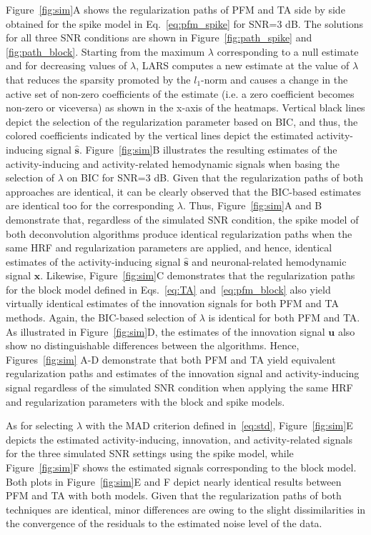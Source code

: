 Figure~\ref{fig:sim}A shows the regularization paths of PFM and TA side by side obtained for the spike model in Eq.~\eqref{eq:pfm_spike} for SNR=3 dB. The solutions for all three SNR conditions are shown in Figure~\ref{fig:path_spike} and \ref{fig:path_block}. Starting from the maximum $\lambda$ corresponding to a null estimate and for decreasing values of $\lambda$, LARS computes a new estimate at the value of $\lambda$ that reduces the sparsity promoted by the \(l_1\)-norm and causes a change in the active set of non-zero coefficients of the estimate (i.e. a zero coefficient becomes non-zero or viceversa) as shown in the x-axis of the heatmaps. Vertical black lines depict the selection of the regularization parameter based on BIC, and thus, the colored coefficients indicated by the vertical lines depict the estimated activity-inducing signal $\mathbf{\hat{{s}}}$. Figure~\ref{fig:sim}B illustrates the resulting estimates of the activity-inducing and activity-related hemodynamic signals when basing the selection of $\lambda$ on BIC for SNR=3 dB. Given that the regularization paths of both approaches are identical, it can be clearly observed that the BIC-based estimates are identical too for the corresponding $\lambda$. Thus, Figure~\ref{fig:sim}A and B demonstrate that, regardless of the simulated SNR condition, the spike model of both deconvolution algorithms produce identical regularization paths when the same HRF and regularization parameters are applied, and hence, identical estimates of the activity-inducing signal $\mathbf{\hat{{s}}}$ and neuronal-related hemodynamic signal $\mathbf{\hat{{x}}}$. Likewise, Figure~\ref{fig:sim}C demonstrates that the regularization paths for the block model defined in Eqs.~\eqref{eq:TA} and~\eqref{eq:pfm_block} also yield virtually identical estimates of the innovation signals for both PFM and TA methods. Again, the BIC-based selection of $\lambda$ is identical for both PFM and TA. As illustrated in Figure~\ref{fig:sim}D, the estimates of the innovation signal $\mathbf{u}$ also show no distinguishable differences between the algorithms. Hence, Figures~\ref{fig:sim} A-D demonstrate that both PFM and TA yield equivalent regularization paths and estimates of the innovation signal and activity-inducing signal regardless of the simulated SNR condition when applying the same HRF and regularization parameters with the block and spike models.

As for selecting $\lambda$ with the MAD criterion defined in~\eqref{eq:std}, Figure~\ref{fig:sim}E depicts the estimated activity-inducing, innovation, and activity-related signals for the three simulated SNR settings using the spike model, while Figure~\ref{fig:sim}F shows the estimated signals corresponding to the block model. Both plots in Figure~\ref{fig:sim}E and F depict nearly identical results between PFM and TA with both models. Given that the regularization paths of both techniques are identical, minor differences are owing to the slight dissimilarities in the convergence of the residuals to the estimated noise level of the data.

